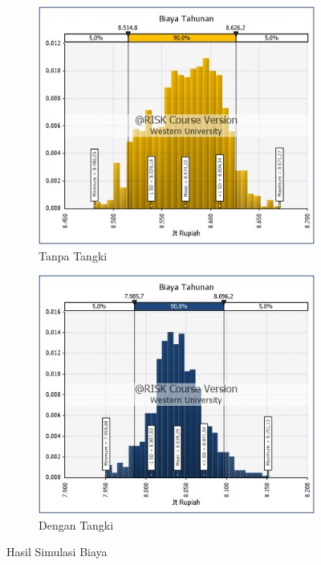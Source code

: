 \begin{figure}[!ht]
    \centering
    \begin{subfigure}{0.4\textwidth}
        \centering
        \includegraphics[width=\textwidth]{grafik/biaya-tahunan-baru.jpg}
        \caption{Tanpa Tangki}
    \end{subfigure}
    \hspace{0.04\textwidth}  %
    \begin{subfigure}{0.4\textwidth}
        \centering
        \includegraphics[width=\textwidth]{grafik/biaya-tahunan-baru-tangki.jpg}
        \caption{Dengan Tangki}    
    \end{subfigure}
    \caption{Hasil Simulasi Biaya}
    \label{fig:annual-cost-dist}
\end{figure}

